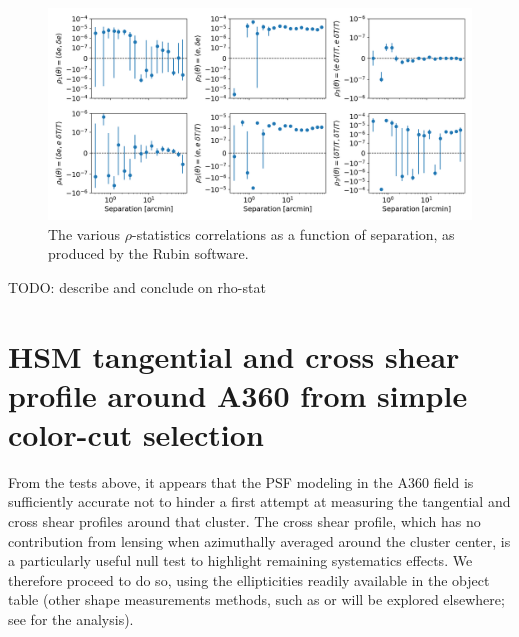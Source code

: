 \documentclass[SE,lsstdraft,authoryear,toc]{lsstdoc}
\begin{document}
\begin{figure}
\centering
\includegraphics[width=\textwidth]{Figures/rho_stat_noband.png}
\caption{The various $\rho$-statistics correlations as a function of separation, as produced by the Rubin  software.\label{fig:rho_stat}}
\end{figure}

{\color{red} TODO: describe and conclude on rho-stat}



\section{HSM tangential and cross shear profile around A360 from simple color-cut selection}
\label{sec:shear_profile}

From the tests above, it appears that the PSF modeling in the A360 field is sufficiently accurate not to hinder a first attempt at measuring the tangential and cross shear profiles around that cluster. The cross shear profile, which has no contribution from lensing when azimuthally averaged around the cluster center, is a particularly useful null test to highlight remaining systematics effects. We therefore proceed to do so, using the  ellipticities readily available in the object table (other shape measurements methods, such as  or  will be explored elsewhere; see  for the  analysis). 
\end{document}
